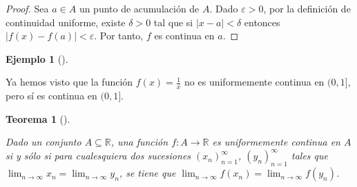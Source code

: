 \documentclass[
  a4paper,
]{scrreport}
\theoremstyle{definition}
\theoremstyle{definition}
\newtheorem{example}{Ejemplo}[chapter]
\theoremstyle{definition}
\theoremstyle{plain}
\newtheorem{theorem}{Teorema}[chapter]
\theoremstyle{plain}
\theoremstyle{plain}
\theoremstyle{remark}
\begin{document}
\begin{tcolorbox}[enhanced jigsaw, bottomtitle=1mm, title=\textcolor{quarto-callout-note-color}{\faInfo}\hspace{0.5em}{Demostración}, colbacktitle=quarto-callout-note-color!10!white, coltitle=black, leftrule=.75mm, colback=white, toptitle=1mm, toprule=.15mm, titlerule=0mm, opacitybacktitle=0.6, colframe=quarto-callout-note-color-frame, bottomrule=.15mm, arc=.35mm, rightrule=.15mm, breakable, left=2mm, opacityback=0]

\begin{proof}
Sea \(a\in A\) un punto de acumulación de \(A\). Dado \(\varepsilon>0\),
por la definición de continuidad uniforme, existe \(\delta>0\) tal que
si \(|x-a|<\delta\) entonces \(|f(x)-f(a)|<\varepsilon\). Por tanto,
\(f\) es continua en \(a\).
\end{proof}

\end{tcolorbox}

\begin{example}[]\protect\hypertarget{exm-funcion-no-uniformemente-continua}{}\label{exm-funcion-no-uniformemente-continua}

Ya hemos visto que la función \(f(x)=\frac{1}{x}\) no es uniformemente
continua en \((0,1]\), pero sí es continua en \((0,1]\).

\end{example}

\begin{theorem}[]\protect\hypertarget{thm-continuidad-uniforme-sucesiones}{}\label{thm-continuidad-uniforme-sucesiones}

Dado un conjunto \(A\subseteq \mathbb{R}\), una función
\(f:A\to \mathbb{R}\) es uniformemente continua en \(A\) si y sólo si
para cualesquiera dos sucesiones \((x_n)_{n=1}^\infty\),
\((y_n)_{n=1}^\infty\) tales que
\(\lim_{n\to\infty}x_n=\lim_{n\to\infty}y_n\), se tiene que
\(\lim_{n\to\infty}f(x_n)=\lim_{n\to\infty}f(y_n)\).

\end{theorem}
\end{document}
